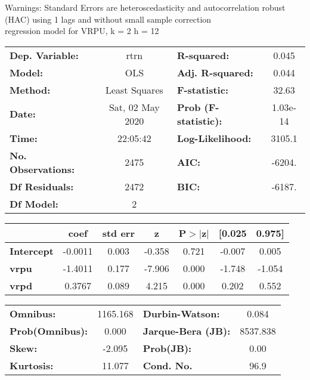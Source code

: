 Warnings: \newline
 [1] Standard Errors are heteroscedasticity and autocorrelation robust (HAC) using 1 lags and without small sample correction\\ 

regression model for VRPU, k = 2 h = 12\begin{center}
\begin{tabular}{lclc}
\toprule
\textbf{Dep. Variable:}    &       rtrn       & \textbf{  R-squared:         } &     0.045   \\
\textbf{Model:}            &       OLS        & \textbf{  Adj. R-squared:    } &     0.044   \\
\textbf{Method:}           &  Least Squares   & \textbf{  F-statistic:       } &     32.63   \\
\textbf{Date:}             & Sat, 02 May 2020 & \textbf{  Prob (F-statistic):} &  1.03e-14   \\
\textbf{Time:}             &     22:05:42     & \textbf{  Log-Likelihood:    } &    3105.1   \\
\textbf{No. Observations:} &        2475      & \textbf{  AIC:               } &    -6204.   \\
\textbf{Df Residuals:}     &        2472      & \textbf{  BIC:               } &    -6187.   \\
\textbf{Df Model:}         &           2      & \textbf{                     } &             \\
\bottomrule
\end{tabular}
\begin{tabular}{lcccccc}
                   & \textbf{coef} & \textbf{std err} & \textbf{z} & \textbf{P$> |$z$|$} & \textbf{[0.025} & \textbf{0.975]}  \\
\midrule
\textbf{Intercept} &      -0.0011  &        0.003     &    -0.358  &         0.721        &       -0.007    &        0.005     \\
\textbf{vrpu}      &      -1.4011  &        0.177     &    -7.906  &         0.000        &       -1.748    &       -1.054     \\
\textbf{vrpd}      &       0.3767  &        0.089     &     4.215  &         0.000        &        0.202    &        0.552     \\
\bottomrule
\end{tabular}
\begin{tabular}{lclc}
\textbf{Omnibus:}       & 1165.168 & \textbf{  Durbin-Watson:     } &    0.084  \\
\textbf{Prob(Omnibus):} &   0.000  & \textbf{  Jarque-Bera (JB):  } & 8537.838  \\
\textbf{Skew:}          &  -2.095  & \textbf{  Prob(JB):          } &     0.00  \\
\textbf{Kurtosis:}      &  11.077  & \textbf{  Cond. No.          } &     96.9  \\
\bottomrule
\end{tabular}
\end{center}

